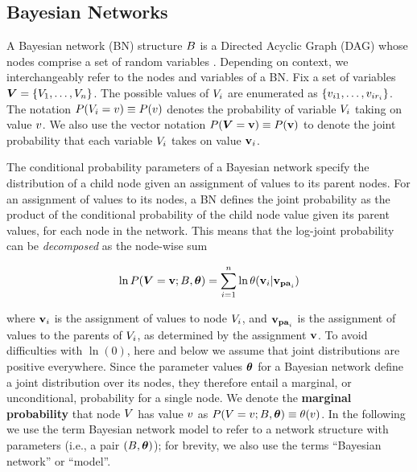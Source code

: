 {{\subsection{Bayesian Networks}

A Bayesian network (BN) structure $B$ is a Directed Acyclic Graph (DAG)  whose nodes comprise a set of random variables \cite{Pearl1988}. Depending on context, we interchangeably refer to the nodes  and variables of a BN. Fix a set of variables $\boldsymbol{V} = \{V_{1},\ldots,V_{n}\}$. 
The possible values of $V_{i}$ are enumerated as $\{v_{i1},\ldots,v_{ir_{i}}\}$. The notation $P(V_{i} = v)\equiv P(v)$ denotes the probability of variable $V_{i}$ taking on value $v$. We also use the vector notation $P(\boldsymbol{V} = \mathbf{v}) \equiv P(\mathbf{v})$ to denote the joint probability that each variable $V_{i}$ takes on value $\mathbf{v}_{i}$. 


The conditional probability parameters of a Bayesian network specify the distribution of a child node given an assignment of values to its parent nodes. For an assignment of values to its nodes, a BN defines the joint probability as the product of the conditional probability of the child node value given its parent values, for each node in the network. This means that the log-joint probability can be {\em decomposed} as the node-wise sum

\begin{equation} \label{eq:bn}
\ln P(\boldsymbol{V} = \mathbf{v};B,\boldsymbol{\theta}) = \sum_{i=1}^{n} \ln \theta(\mathbf{v}_{i}|\mathbf{v}_{\mathbf{pa}_{i}})
\end{equation}

\noindent where $\mathbf{v}_{i}$ is the assignment of values to node $V_{i}$, and $\mathbf{v}_{\mathbf{pa}_{i}}$  is the assignment of values to the parents of $V_{i}$, as determined by the assignment $\mathbf{v}$. 
To avoid difficulties with $\ln(0)$, here and below we assume that joint distributions are positive everywhere. Since the parameter values $\boldsymbol{\theta}$ for a Bayesian network define a joint distribution over its nodes, they therefore entail a marginal, or unconditional, probability for a single node. We denote the \textbf{marginal probability} that node $V$ has value $v$ as $P(V = v;B,\boldsymbol{\theta}) \equiv \theta(v)$. In the following we use the term Bayesian network model to refer to a network structure with parameters (i.e., a pair $(B,\boldsymbol{\theta})$); for brevity, we also use the terms ``Bayesian network'' or ``model''. 

}}
